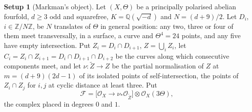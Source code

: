 \documentclass[11pt,reqno]{amsart}
\theoremstyle{plain}
\theoremstyle{definition}
\newtheorem{setupenv}[theorem]{Setup}
\theoremstyle{remark}
\newcommand{\QQ}{\mathbb{Q}}
\newcommand{\ZZ}{\mathbb{Z}}
\newcommand{\cF}{\mathcal{F}}
\newcommand{\cO}{\mathcal{O}}
\begin{document}
\begin{setupenv}[Markman's object]\label{setup:markman}
Let $(X,\Theta)$ be a principally polarised abelian fourfold, $d\ge3$ odd and
squarefree, $K=\QQ(\sqrt{-d})$ and $N=(d+9)/2$. Let $D_{i}$, $i\in\ZZ/N\ZZ$,
be $N$ translates of $\Theta$ in general position: any two, three or four of
them meet transversally, in a surface, a curve and $\Theta^{4}=24$ points,
and any five have empty intersection. Put $Z_{i}=D_{i}\cap D_{i+1}$,
$Z=\bigcup_{i}Z_{i}$, let $C_{i}=Z_{i}\cap Z_{i+1}=D_{i}\cap D_{i+1}\cap D_{i+2}$
be the curves along which consecutive components meet, and let
$\nu\colon\widetilde{Z}\to Z$ be the partial normalisation of $Z$ at
$m=(d+9)(2d-1)$ of its isolated points of self-intersection, the points of
$Z_{i}\cap Z_{j}$ for $i,j$ at cyclic distance at least three. Put
\[
  \cF=\bigl[\cO_{X}\longrightarrow\nu_{*}\cO_{\widetilde{Z}}\bigr]\otimes\cO_{X}(3\Theta),
\]
the complex placed in degrees $0$ and $1$.
\end{setupenv}
\end{document}
